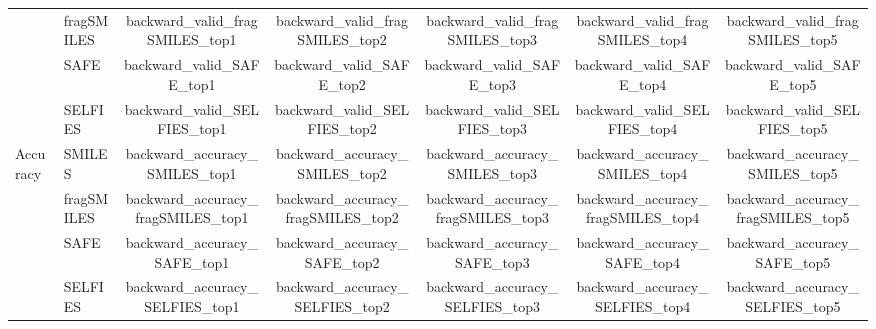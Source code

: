\begin{tabular}{llccccc}
    ~ & fragSMILES & {{ backward_valid_fragSMILES_top1 }} & {{ backward_valid_fragSMILES_top2 }} & {{ backward_valid_fragSMILES_top3 }} & {{ backward_valid_fragSMILES_top4 }} & {{ backward_valid_fragSMILES_top5 }} \\
    ~ & SAFE & {{ backward_valid_SAFE_top1 }} & {{ backward_valid_SAFE_top2 }} & {{ backward_valid_SAFE_top3 }} & {{ backward_valid_SAFE_top4 }} & {{ backward_valid_SAFE_top5 }} \\
    ~ & SELFIES & {{ backward_valid_SELFIES_top1 }} & {{ backward_valid_SELFIES_top2 }} & {{ backward_valid_SELFIES_top3 }} & {{ backward_valid_SELFIES_top4 }} & {{ backward_valid_SELFIES_top5 }} \\
    \hline
    Accuracy & SMILES & {{ backward_accuracy_SMILES_top1 }} & {{ backward_accuracy_SMILES_top2 }} & {{ backward_accuracy_SMILES_top3 }} & {{ backward_accuracy_SMILES_top4 }} & {{ backward_accuracy_SMILES_top5 }} \\
    ~ & fragSMILES & {{ backward_accuracy_fragSMILES_top1 }} & {{ backward_accuracy_fragSMILES_top2 }} & {{ backward_accuracy_fragSMILES_top3 }} & {{ backward_accuracy_fragSMILES_top4 }} & {{ backward_accuracy_fragSMILES_top5 }} \\
    ~ & SAFE & {{ backward_accuracy_SAFE_top1 }} & {{ backward_accuracy_SAFE_top2 }} & {{ backward_accuracy_SAFE_top3 }} & {{ backward_accuracy_SAFE_top4 }} & {{ backward_accuracy_SAFE_top5 }} \\
    ~ & SELFIES & {{ backward_accuracy_SELFIES_top1 }} & {{ backward_accuracy_SELFIES_top2 }} & {{ backward_accuracy_SELFIES_top3 }} & {{ backward_accuracy_SELFIES_top4 }} & {{ backward_accuracy_SELFIES_top5 }} \\
    \bottomrule
\end{tabular}